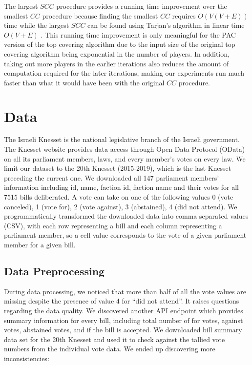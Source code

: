 \documentclass[letterpaper]{article} %
\theoremstyle{definition}
\begin{document}
The largest $SCC$ procedure provides a running time improvement over the smallest $CC$ procedure because finding the smallest $CC$ requires $O(V(V + E))$ time while the largest $SCC$ can be found using Tarjan's algorithm in linear time $O(V + E)$ \cite{Tarjan72depthfirst}. 
This running time improvement is only meaningful for the PAC version of the top covering algorithm due to the input size of the original top covering algorithm being exponential in the number of players. 
In addition, taking out more players in the earlier iterations also reduces the amount of computation required for the later iterations, making our experiments run much faster than what it would have been with the original $CC$ procedure.

\section{Data}
The Israeli Knesset is the national legislative branch of the Israeli government. The Knesset website provides data access through Open Data Protocol (OData) on all its parliament members, laws, and every member's votes on every law. 
We limit our dataset to the 20th Knesset (2015-2019), which is the last Knesset preceding the current one. We downloaded all 147 parliament members' information including id, name, faction id, faction name and their votes for all 7515 bills deliberated. A vote can take on one of the following values 0 (vote canceled), 1 (vote for), 2 (vote against), 3 (abstained), 4 (did not attend). 
We programmatically transformed the downloaded data into comma separated values (CSV), with each row representing a bill and each column representing a parliament member, so a cell value corresponds to the vote of a given parliament member for a given bill.

\subsection{Data Preprocessing}
During data processing, we noticed that more than half of all the vote values are missing despite the presence of value 4 for ``did not attend''. 
It raises questions regarding the data quality. We discovered another API endpoint which provides summary information for every bill, including total number of for votes, against votes, abstained votes, and if the bill is accepted. We downloaded bill summary data set for the 20th Knesset and used it to check against the tallied vote numbers from the individual vote data. We ended up discovering more inconsistencies:
\end{document}
